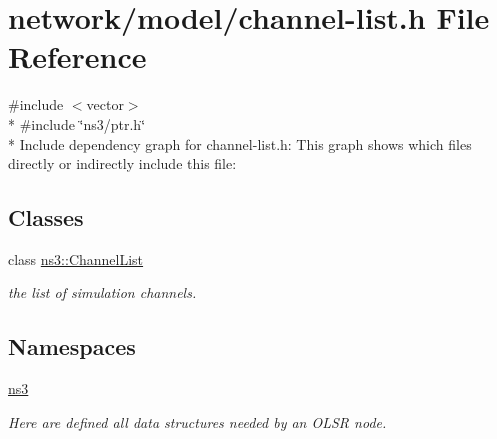 \hypertarget{channel-list_8h}{}\section{network/model/channel-\/list.h File Reference}
\label{channel-list_8h}
{\ttfamily \#include $<$vector$>$}\\*
{\ttfamily \#include \char`\"{}ns3/ptr.\+h\char`\"{}}\\*
Include dependency graph for channel-\/list.h\+:
This graph shows which files directly or indirectly include this file\+:
\subsection*{Classes}
\begin{DoxyCompactItemize}
\item 
class \hyperlink{classns3_1_1ChannelList}{ns3\+::\+Channel\+List}
\begin{DoxyCompactList}\small\item\em the list of simulation channels. \end{DoxyCompactList}\end{DoxyCompactItemize}
\subsection*{Namespaces}
\begin{DoxyCompactItemize}
\item 
 \hyperlink{namespacens3}{ns3}
\begin{DoxyCompactList}\small\item\em Here are defined all data structures needed by an O\+L\+SR node. \end{DoxyCompactList}\end{DoxyCompactItemize}
